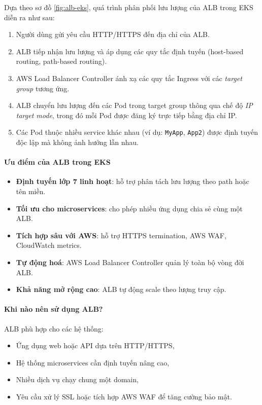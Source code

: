 Dựa theo sơ đồ \ref{fig:alb-eks}, quá trình phân phối lưu lượng của ALB trong EKS diễn ra như sau:

\begin{enumerate}
    \item Người dùng gửi yêu cầu HTTP/HTTPS đến địa chỉ của ALB.
    \item ALB tiếp nhận lưu lượng và áp dụng các quy tắc định tuyến (host-based routing, path-based routing).
    \item AWS Load Balancer Controller ánh xạ các quy tắc Ingress với các \textit{target group} tương ứng.
    \item ALB chuyển lưu lượng đến các Pod trong target group thông qua chế độ \textit{IP target mode}, 
    trong đó mỗi Pod được đăng ký trực tiếp bằng địa chỉ IP.
    \item Các Pod thuộc nhiều service khác nhau (ví dụ: \texttt{MyApp}, \texttt{App2}) được định tuyến 
    độc lập mà không ảnh hưởng lẫn nhau.
\end{enumerate}

\paragraph*{Ưu điểm của ALB trong EKS}

\begin{itemize}
    \item \textbf{Định tuyến lớp 7 linh hoạt}: hỗ trợ phân tách lưu lượng theo path hoặc tên miền.
    \item \textbf{Tối ưu cho microservices}: cho phép nhiều ứng dụng chia sẻ cùng một ALB.
    \item \textbf{Tích hợp sâu với AWS}: hỗ trợ HTTPS termination, AWS WAF, CloudWatch metrics.
    \item \textbf{Tự động hoá}: AWS Load Balancer Controller quản lý toàn bộ vòng đời ALB.
    \item \textbf{Khả năng mở rộng cao}: ALB tự động scale theo lượng truy cập.
\end{itemize}

\paragraph*{Khi nào nên sử dụng ALB?}

ALB phù hợp cho các hệ thống:

\begin{itemize}
    \item Ứng dụng web hoặc API dựa trên HTTP/HTTPS,
    \item Hệ thống microservices cần định tuyến nâng cao,
    \item Nhiều dịch vụ chạy chung một domain,
    \item Yêu cầu xử lý SSL hoặc tích hợp AWS WAF để tăng cường bảo mật.
\end{itemize}

